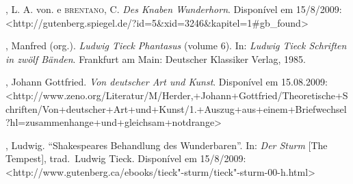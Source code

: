 \begin{bibliohedra}

, L. A. von. e \textsc{brentano}, C. \textit{Des Knaben Wunderhorn}.
Disponível em 15/8/2009: 
<http://gutenberg.spiegel.de/?id=5\&xid=3246\&\break kapitel=1\#gb\_found>

, Manfred (org.). \textit{Ludwig Tieck Phantasus }(volume
6). In: \textit{Ludwig Tieck Schriften in zwölf Bänden}.  Frankfurt am
Main: Deutscher Klassiker Verlag, 1985. 

, Johann Gottfried. \textit{Von deutscher Art und Kunst}.
Disponível em 15.08.2009: <http://www.zeno.org/Literatur/M/Herder,+Johann\break+Gottfried/Theoretische+Schriften/Von+deutscher+Art+und+\break Kunst/1.+Auszug+aus+einem+Briefwechsel?hl=zusammenhange\break +und+gleichsam+notdrange>

, Ludwig. “Shakespeares Behandlung des Wunderbaren”. In:
\textit{Der Sturm} [The Tempest], trad.~Ludwig Tieck. Disponível em 15/8/2009: 
<http://www.gutenberg.ca/ebooks/tieck"-sturm/tieck"-sturm-00-h.html>

\end{bibliohedra}


















